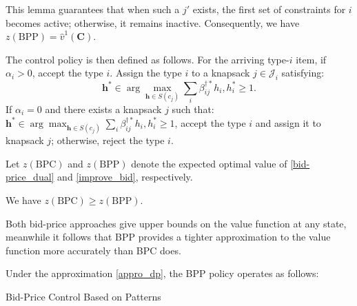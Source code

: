This lemma guarantees that when such a $j{'}$ exists, the first set of constraints for $i$ becomes active; otherwise, it remains inactive. Consequently, we have $z(\text{BPP}) = \hat{v}^{1}(\bm{C})$.

The control policy is then defined as follows. For the arriving type-$i$ item, if $\alpha_{i} > 0$, accept the type $i$. Assign the type $i$ to a knapsack $j \in \mathcal{J}_{i}$ satisfying: $$\bm{h}^{*} \in \arg\max_{\bm{h} \in S(c_j)} \sum_{i} \beta_{ij}^{\dag *} h_{i}, h_{i}^{*} \geq 1.$$ If $\alpha_{i} = 0$ and there exists a knapsack $j$ such that: $\bm{h}^{*} \in \arg\max_{\bm{h} \in S(c_j)} \sum_{i} \beta_{ij}^{\dag *} h_{i}, h_{i}^{*} \geq 1$, accept the type $i$ and assign it to knapsack $j$; otherwise, reject the type $i$.

Let $z(\text{BPC})$ and $z(\text{BPP})$ denote the expected optimal value of \eqref{bid-price_dual} and \eqref{improve_bid}, respectively.

\begin{prop}\label{BPC_relation}
    We have $z(\text{BPC}) \geq z(\text{BPP})$.
\end{prop}
    

    
Both bid-price approaches give upper bounds on the value function at any state, meanwhile it follows that BPP provides a tighter approximation to the value function more accurately than BPC does.

Under the approximation \eqref{appro_dp}, the BPP policy operates as follows:



\begin{algorithm}[H]
    \caption{Bid-Price Control Based on Patterns}\label{algo_improve_bid}
\end{algorithm}

